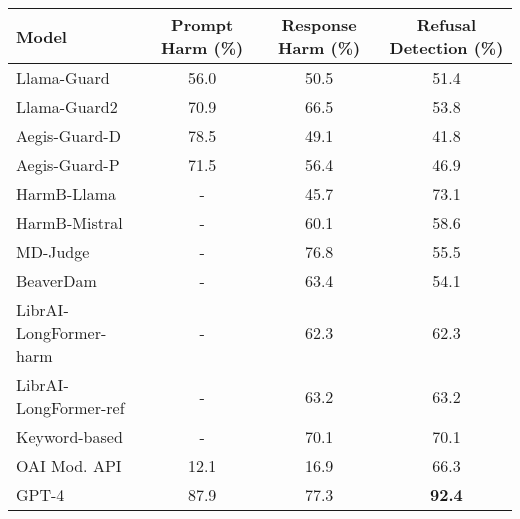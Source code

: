 \documentclass{article}
\begin{document}
\begin{itemize}
\begin{itemize}
\begin{table}[h!]
\centering
\begin{tabular}{|l|c|c|c|}
\hline
\textbf{Model}              & \textbf{Prompt Harm (\%) } & \textbf{Response Harm (\%)} & \textbf{Refusal Detection (\%)} \\ \hline
Llama-Guard                 & 56.0                     & 50.5                         & 51.4                                 \\ \hline
Llama-Guard2                & 70.9                            & 66.5                              & 53.8                                 \\ \hline
Aegis-Guard-D               & 78.5                            & 49.1                              & 41.8                                 \\ \hline
Aegis-Guard-P               & 71.5                            & 56.4                              & 46.9                                 \\ \hline
HarmB-Llama                 & -                               & 45.7                              & 73.1                                 \\ \hline
HarmB-Mistral               & -                               & 60.1                              & 58.6                                 \\ \hline
MD-Judge                    & -                               & 76.8                              & 55.5                                 \\ \hline
BeaverDam                   & -                               & 63.4                              & 54.1                                 \\ \hline
LibrAI-LongFormer-harm      & -                               & 62.3                              & 62.3                                 \\ \hline
LibrAI-LongFormer-ref       & -                               & 63.2                              & 63.2                                 \\ \hline
Keyword-based               & -                               & 70.1                              & 70.1                                 \\ \hline
OAI Mod. API                & 12.1                            & 16.9                              & 66.3                                 \\ \hline
GPT-4                       & 87.9                            & 77.3                              & \textbf{92.4}                                 \\ \hline

\end{tabular}
\end{table}
\end{itemize}
\end{itemize}
\end{document}
